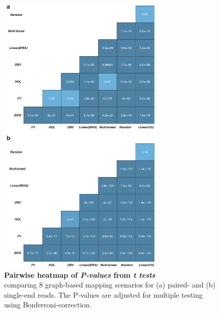 \documentclass[../main.tex]{subfiles}
\begin{document}
\begin{flushleft}
\begin{figure}[!htb]
    \centering
    \includegraphics[width=0.7\textwidth]{paper2/supplement/sp39.pdf}
    \caption{\textbf{Pairwise heatmap of \emph{P-values} from \emph{t tests}} \\
    \small{comparing 8 graph-based
    mapping scenarios for (a) paired- and (b) single-end reads. The P-values are
    adjusted for multiple testing using Bonferroni-correction.}}
    \label{sup_fig:s39}
\end{figure}


\end{flushleft}
\end{document}

